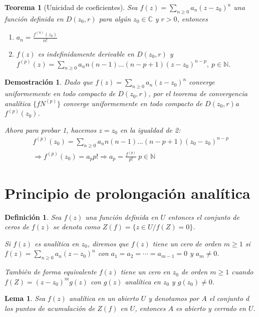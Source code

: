 \documentclass[12pt]{book}
\newtheorem{defi}{Definición}[chapter]
\newtheorem{theorem}{Teorema}[chapter]
\newtheorem*{dem}{Demostración}
\newtheorem{lema}{Lema}[chapter]
\newcommand{\C}{\mathbb{C}}
\newcommand{\N}{\mathbb{N}}
\begin{document}
\begin{theorem}[Unicidad de coeficientes]
Sea $f(z)  = \sum_{n\geq 0} a_n(z-z_0)^n$ una función definida en $D(z_0,r)$ para algún $z_0\in \C$ y $r>0$, entonces
\begin{enumerate}
\item $a_n = \frac{f^{(n)}(z_0)}{n!}$
\item $f(z)$ es indefinidamente derivable en  $D(z_0,r)$ y $f^{(p)}(z) = \sum_{n\geq 0}a_nn(n-1)\ldots (n-p+1)(z-z_0)^{n-p},\ p\in \N$.
\end{enumerate}
\end{theorem}

\begin{dem}
Dado que $f(z) = \sum_{n\geq 0} a_n(z-z_0)^n$ converge uniformemente en todo compacto de $D(z_0,r)$, por el teorema de convergencia analítica $\{fN^{(p)}\}$ converge uniformemente en todo compacto de $D(z_0,r)$a $f^{(p)}(z_0)$.

Ahora para probar 1, hacemos $z=z_0$ en la igualdad de 2:
\begin{align*}
f^{(p)}(z_0) = \sum_{n\geq 0}a_nn(n-1)\ldots (n-p+1)(z_0-z_0)^{n-p}\\
\Rightarrow f^{(p)}(z_0)= a_p p!\Rightarrow a_p = \frac{f^{(p)}}{p!}\ p\in \N
\end{align*}
\end{dem}

\section{Principio de prolongación analítica}

\begin{defi}
Sea $f(z)$ una función definida en $U$ entonces el conjunto de ceros de $f(z)$ se denota como $Z(f) = \{z\in U / f(Z) = 0\}$.

Si $f(z)$ es analítica en $z_0$, diremos que $f(z)$ tiene un cero de orden $m\geq 1$ si $f(z) = \sum_{n\geq0} a_n(z-z_0)^n$ con $a_1 = a_2 = \cdots=a_{m-1} = 0$ y $a_m \neq 0$.

También de forma equivalente $f(z)$ tiene un cero en $z_0$ de orden $m\geq 1$ cuando $f(Z) = (z-z_0)^m g(z)$ con $g(z)$ analítica en $z_0$ y $g(z_0)\neq 0$.
\end{defi}

\begin{lema}
Sea $f(z)$ analítica en un abierto $U$ y denotamos por $A$ el conjunto d los puntos de acumulación de $Z(f)$ en $U$, entonces $A$ es abierto y cerrado en $U$.
\end{lema}
\end{document}
